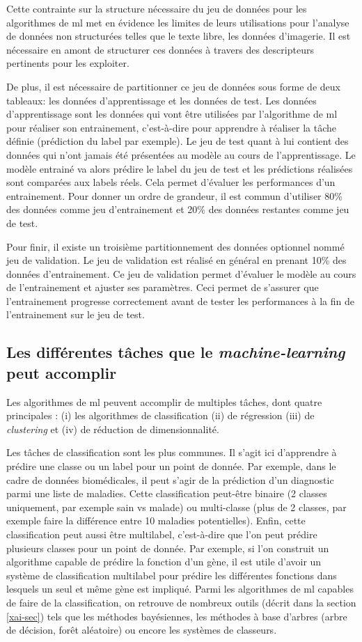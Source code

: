 Cette contrainte sur la structure nécessaire du jeu de données pour les algorithmes de \gls{ml} met en évidence les limites de leurs utilisations pour l'analyse de données non structurées telles que le texte libre, les données d'imagerie. Il est nécessaire en amont de structurer ces données à travers des descripteurs pertinents pour les exploiter.

De plus, il est nécessaire de partitionner ce jeu de données sous forme de deux tableaux: les données d'apprentissage et les données de test. Les données d'apprentissage sont les données qui vont être utilisées par l'algorithme de \gls{ml} pour réaliser son entrainement, c'est-à-dire pour apprendre à réaliser la tâche définie (prédiction du label par exemple). Le jeu de test quant à lui contient des données qui n'ont jamais été présentées au modèle au cours de l'apprentissage. Le modèle entrainé va alors prédire le label du jeu de test et les prédictions réalisées sont comparées aux labels réels. Cela permet d'évaluer les performances d'un entrainement. Pour donner un ordre de grandeur, il est commun d'utiliser 80\% des données comme jeu d'entrainement et 20\% des données restantes comme jeu de test.

Pour finir, il existe un troisième partitionnement des données optionnel nommé jeu de validation. Le jeu de validation est réalisé en général en prenant 10\% des données d'entrainement. Ce jeu de validation permet d'évaluer le modèle au cours de l'entrainement et ajuster ses paramètres. Ceci permet de s'assurer que l'entrainement progresse correctement avant de tester les performances à la fin de l'entrainement sur le jeu de test.

\subsection{Les différentes tâches que le \textit{machine-learning} peut accomplir}
Les algorithmes de \gls{ml} peuvent accomplir de multiples tâches, dont quatre principales : (i) les algorithmes de classification (ii) de régression (iii) de \textit{clustering} et (iv) de réduction de dimensionnalité.

Les tâches de classification sont les plus communes. Il s'agit ici d'apprendre à prédire une classe ou un label pour un point de donnée. Par exemple, dans le cadre de données biomédicales, il peut s'agir de la prédiction d'un diagnostic parmi une liste de maladies. Cette classification peut-être binaire (2 classes uniquement, par exemple sain vs malade) ou multi-classe (plus de 2 classes, par exemple faire la différence entre 10 maladies potentielles). Enfin, cette classification peut aussi être multilabel, c'est-à-dire que l'on peut prédire plusieurs classes pour un point de donnée. Par exemple, si l’on construit un algorithme capable de prédire la fonction d'un gène, il est utile d'avoir un système de classification multilabel pour prédire les différentes fonctions dans lesquels un seul et même gène est impliqué. Parmi les algorithmes de \gls{ml} capables de faire de la classification, on retrouve de nombreux outils (décrit dans la section \ref{xai-sec}) tels que les méthodes bayésiennes, les méthodes à base d'arbres (arbre de décision, forêt aléatoire) ou encore les systèmes de classeurs.

